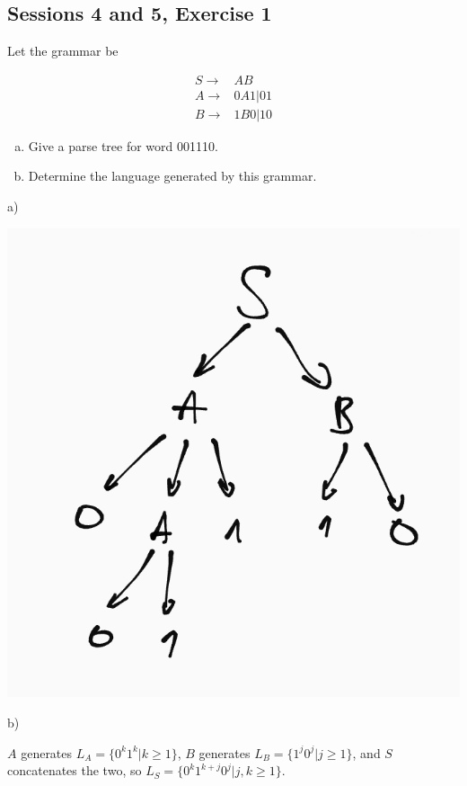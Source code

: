 \subsection{Sessions 4 and 5, Exercise 1}


Let the grammar be

\begin{align*}
S \rightarrow& AB\\
A \rightarrow& 0A1|01\\
B \rightarrow& 1B0|10
\end{align*}

\begin{enumerate}[(a)]
\item Give a parse tree for word 001110.
\item Determine the language generated by this grammar.
\end{enumerate}


a)

\includegraphics[width=0.5\linewidth]{04/4_1_a.png}


b)

$A$ generates $L_A = \{0^k1^k | k \geq{} 1\}$, $B$ generates $L_B = \{1^j0^j | j \geq{} 1\}$, and $S$ concatenates the two, so $L_S = \{0^k1^{k+j}0^j | j,k \geq{} 1\}$.